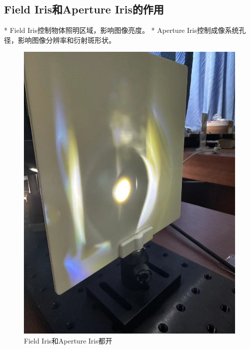 \documentclass{ctexart}
\begin{document}
\subsection{Field Iris和Aperture Iris的作用}
* Field Iris控制物体照明区域，影响图像亮度。
* Aperture Iris控制成像系统孔径，影响图像分辨率和衍射斑形状。
\begin{figure}[H]
  \centering
  \begin{minipage}[b]{0.2\textwidth}
    \centering
    \includegraphics[width=\textwidth]{pictures/微信图片_20241010201015.jpg}
    \caption{Field Iris和Aperture Iris都开}
  \end{minipage}
  \hspace{0.05\textwidth} %
  \begin{minipage}[b]{0.2\textwidth}
    \centering

\end{minipage}
\end{figure}
\end{document}
